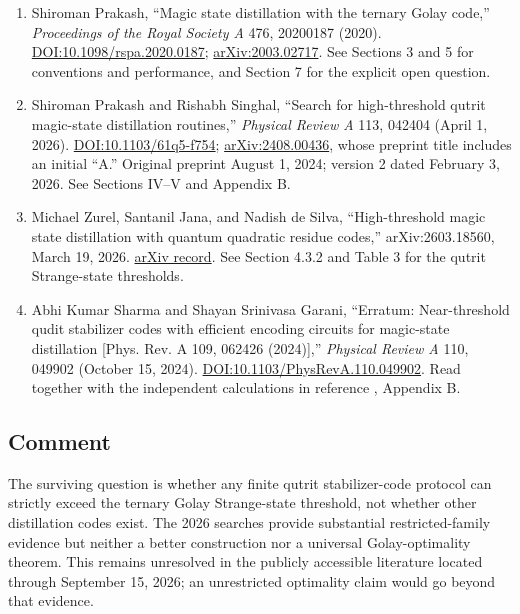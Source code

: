 \begin{enumerate}[label={},leftmargin=4.8em,labelsep=0.5em]
  \footnotesize
  \item[\textup{[Prakash20]}]\label{ref:9532-prakash20}
  Shiroman Prakash, “Magic state distillation with the ternary Golay code,” \emph{Proceedings of the Royal Society A} 476, 20200187 (2020). \href{https://doi.org/10.1098/rspa.2020.0187}{DOI:10.1098/rspa.2020.0187}; \href{https://arxiv.org/abs/2003.02717}{arXiv:2003.02717}. See Sections 3 and 5 for conventions and performance, and Section 7 for the explicit open question.

  \item[\textup{[Prakash26]}]\label{ref:9532-prakash26}
  Shiroman Prakash and Rishabh Singhal, “Search for high-threshold qutrit magic-state distillation routines,” \emph{Physical Review A} 113, 042404 (April 1, 2026). \href{https://doi.org/10.1103/61q5-f754}{DOI:10.1103/61q5-f754}; \href{https://arxiv.org/abs/2408.00436}{arXiv:2408.00436}, whose preprint title includes an initial “A.” Original preprint August 1, 2024; version 2 dated February 3, 2026. See Sections IV–V and Appendix B.

  \item[\textup{[Zurel26]}]\label{ref:9532-zurel26}
  Michael Zurel, Santanil Jana, and Nadish de Silva, “High-threshold magic state distillation with quantum quadratic residue codes,” arXiv:2603.18560, March 19, 2026. \href{https://arxiv.org/abs/2603.18560}{arXiv record}. See Section 4.3.2 and Table 3 for the qutrit Strange-state thresholds.

  \item[\textup{[Sharma24]}]\label{ref:9532-sharma24}
  Abhi Kumar Sharma and Shayan Srinivasa Garani, “Erratum: Near-threshold qudit stabilizer codes with efficient encoding circuits for magic-state distillation [Phys. Rev. A 109, 062426 (2024)],” \emph{Physical Review A} 110, 049902 (October 15, 2024). \href{https://doi.org/10.1103/PhysRevA.110.049902}{DOI:10.1103/PhysRevA.110.049902}. Read together with the independent calculations in reference , Appendix B.
\end{enumerate}

\subsection*{Comment}

The surviving question is whether any finite qutrit stabilizer-code protocol can strictly exceed the ternary Golay Strange-state threshold, not whether other distillation codes exist. The 2026 searches provide substantial restricted-family evidence but neither a better construction nor a universal Golay-optimality theorem. This remains unresolved in the publicly accessible literature located through September 15, 2026; an unrestricted optimality claim would go beyond that evidence.

